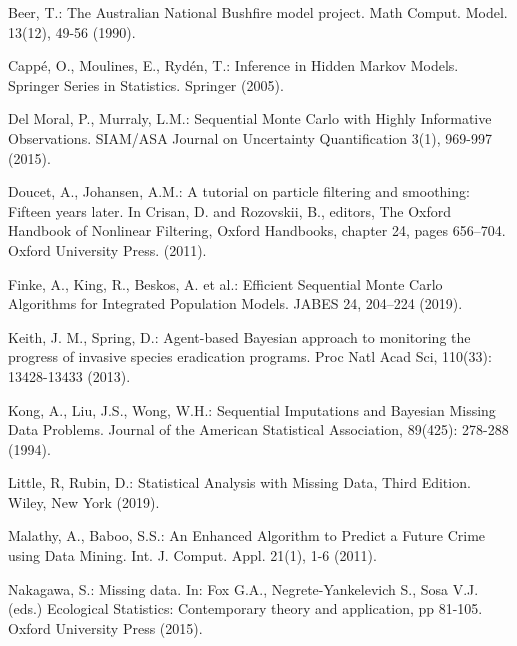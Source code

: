 \begin{thebibliography}{}

Beer, T.: The Australian National Bushfire model project. Math Comput. Model. 13(12), 49-56 (1990).

Capp\'{e}, O., Moulines, E., Ryd\'{e}n, T.: Inference in Hidden Markov Models. Springer Series in Statistics. Springer (2005).

Del Moral, P., Murraly, L.M.: Sequential Monte Carlo with Highly Informative Observations. SIAM/ASA Journal on Uncertainty Quantification 3(1), 969-997 (2015).

Doucet, A., Johansen, A.M.: A tutorial on particle filtering and smoothing: Fifteen years later. In Crisan, D. and Rozovskii, B., editors, The Oxford Handbook of Nonlinear Filtering, Oxford Handbooks, chapter 24, pages 656–704. Oxford University Press. (2011).

Finke, A., King, R., Beskos, A. et al.: Efficient Sequential Monte Carlo Algorithms for Integrated Population Models. JABES 24, 204–224 (2019).

 Keith, J. M., Spring, D.: Agent-based Bayesian approach to monitoring the progress of invasive species eradication programs. Proc Natl Acad Sci, 110(33): 13428-13433 (2013).

 Kong, A., Liu, J.S., Wong, W.H.: Sequential Imputations and Bayesian Missing Data Problems. Journal of the American Statistical Association, 89(425): 278-288 (1994).

 Little, R, Rubin, D.: Statistical Analysis with Missing Data, Third Edition. Wiley, New York (2019).

Malathy, A., Baboo, S.S.: An Enhanced Algorithm to Predict a Future Crime using Data Mining. Int. J. Comput. Appl. 21(1), 1-6 (2011).

Nakagawa, S.: Missing data. In: Fox G.A., Negrete-Yankelevich S., Sosa V.J. (eds.) Ecological Statistics: Contemporary theory and application, pp 81-105. Oxford University Press (2015). 


\end{thebibliography}
